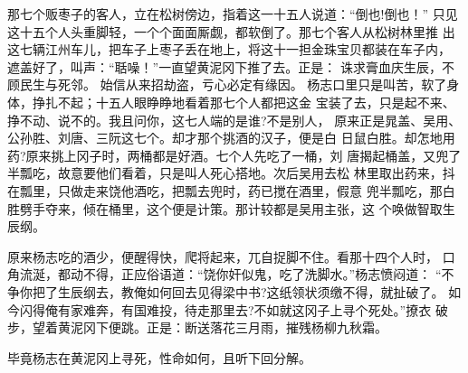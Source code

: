 那七个贩枣子的客人，立在松树傍边，指着这一十五人说道：“倒也!倒也！”
只见这十五个人头重脚轻，一个个面面厮觑，都软倒了。那七个客人从松树林里推
出这七辆江州车儿，把车子上枣子丢在地上，将这十一担金珠宝贝都装在车子内，
遮盖好了，叫声：“聒噪！”一直望黄泥冈下推了去。正是：
诛求膏血庆生辰，不顾民生与死邻。
始信从来招劫盗，亏心必定有缘因。
杨志口里只是叫苦，软了身体，挣扎不起；十五人眼睁睁地看着那七个人都把这金
宝装了去，只是起不来、挣不动、说不的。我且问你，这七人端的是谁?不是别人，
原来正是晁盖、吴用、公孙胜、刘唐、三阮这七个。却才那个挑酒的汉子，便是白
日鼠白胜。却怎地用药?原来挑上冈子时，两桶都是好酒。七个人先吃了一桶，刘
唐揭起桶盖，又兜了半瓢吃，故意要他们看着，只是叫人死心搭地。次后吴用去松
林里取出药来，抖在瓢里，只做走来饶他酒吃，把瓢去兜时，药已搅在酒里，假意
兜半瓢吃，那白胜劈手夺来，倾在桶里，这个便是计策。那计较都是吴用主张，这
个唤做智取生辰纲。

原来杨志吃的酒少，便醒得快，爬将起来，兀自捉脚不住。看那十四个人时，
口角流涎，都动不得，正应俗语道：“饶你奸似鬼，吃了洗脚水。”杨志愤闷道：
“不争你把了生辰纲去，教俺如何回去见得梁中书?这纸领状须缴不得，就扯破了。
如今闪得俺有家难奔，有国难投，待走那里去?不如就这冈子上寻个死处。”撩衣
破步，望着黄泥冈下便跳。正是：断送落花三月雨，摧残杨柳九秋霜。

毕竟杨志在黄泥冈上寻死，性命如何，且听下回分解。